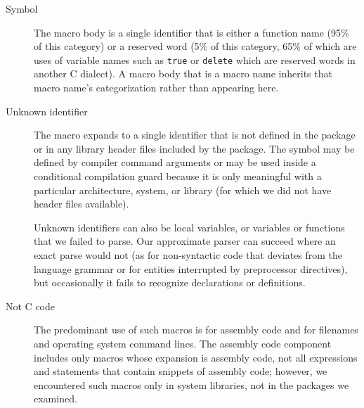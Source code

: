 \documentclass[10pt]{article}
\begin{document}
\begin{description}
\item[Symbol]
  The macro body is a single identifier that is either a function name
  (95\% of this category) or a reserved word (5\% of this category, 65\% of
  which are uses of variable names such as {\tt true} or {\tt delete} which
  are reserved words in another C dialect).  A macro body that is a macro
  name inherits that macro name's categorization rather than appearing
  here.


\item[Unknown identifier]
  The macro expands to a single identifier that is not defined in the package
  or in any library header files included by the package.  The symbol may
  be defined by compiler command arguments or may be used inside a
  conditional compilation guard because it is only meaningful 
  with a particular architecture, system, or library (for which we did not
  have header files available).
  
  Unknown identifiers can also be local variables, or variables or functions that we failed to
  parse.  Our approximate parser can succeed where an exact parse would not
  (as for non-syntactic code that deviates from the language grammar
  or for entities interrupted by preprocessor
  directives), but occasionally it fails to recognize declarations or
  definitions.

\item[Not C code]\label{page:not-c-code}
  The predominant use of such macros is for assembly code and for filenames
  and operating system command lines.  The assembly code component includes
  only macros whose expansion is assembly code, not all expressions and
  statements that contain snippets of assembly code; however, we
  encountered such macros only in system libraries, not in the packages we
  examined.  
  

\end{description}
\end{document}
